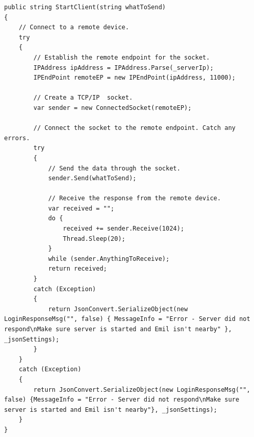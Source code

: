 \begin{lstlisting}[caption={StartClient(...)},label={code:ios_impl_client}]
public string StartClient(string whatToSend)
{
	// Connect to a remote device.
	try
	{
		// Establish the remote endpoint for the socket.
		IPAddress ipAddress = IPAddress.Parse(_serverIp);
		IPEndPoint remoteEP = new IPEndPoint(ipAddress, 11000);

		// Create a TCP/IP  socket.
		var sender = new ConnectedSocket(remoteEP); 

		// Connect the socket to the remote endpoint. Catch any errors.
		try
		{
			// Send the data through the socket.
			sender.Send(whatToSend);

			// Receive the response from the remote device.
			var received = "";
			do {
				received += sender.Receive(1024);
				Thread.Sleep(20);
			}
			while (sender.AnythingToReceive);
			return received;
		}
		catch (Exception)
		{
			return JsonConvert.SerializeObject(new LoginResponseMsg("", false) { MessageInfo = "Error - Server did not respond\nMake sure server is started and Emil isn't nearby" }, _jsonSettings);
		}
	}
	catch (Exception)
	{
		return JsonConvert.SerializeObject(new LoginResponseMsg("", false) {MessageInfo = "Error - Server did not respond\nMake sure server is started and Emil isn't nearby"}, _jsonSettings);
	}
}
\end{lstlisting}
